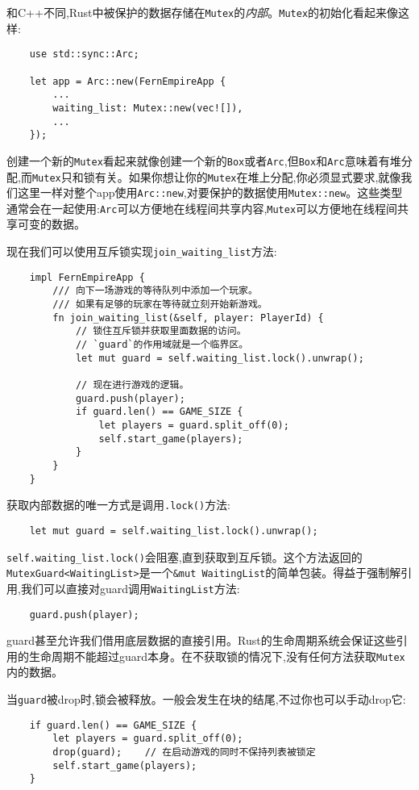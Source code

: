 和C++不同,Rust中被保护的数据存储在\texttt{Mutex}的\emph{内部}。\texttt{Mutex}的初始化看起来像这样:
\begin{verbatim}
    use std::sync::Arc;

    let app = Arc::new(FernEmpireApp {
        ...
        waiting_list: Mutex::new(vec![]),
        ...
    });
\end{verbatim}

创建一个新的\texttt{Mutex}看起来就像创建一个新的\texttt{Box}或者\texttt{Arc},但\texttt{Box}和\texttt{Arc}意味着有堆分配,而\texttt{Mutex}只和锁有关。如果你想让你的\texttt{Mutex}在堆上分配,你必须显式要求,就像我们这里一样对整个app使用\texttt{Arc::new},对要保护的数据使用\texttt{Mutex::new}。这些类型通常会在一起使用:\texttt{Arc}可以方便地在线程间共享内容,\texttt{Mutex}可以方便地在线程间共享可变的数据。

现在我们可以使用互斥锁实现\texttt{join\_waiting\_list}方法:
\begin{verbatim}
    impl FernEmpireApp {
        /// 向下一场游戏的等待队列中添加一个玩家。
        /// 如果有足够的玩家在等待就立刻开始新游戏。
        fn join_waiting_list(&self, player: PlayerId) {
            // 锁住互斥锁并获取里面数据的访问。
            // `guard`的作用域就是一个临界区。
            let mut guard = self.waiting_list.lock().unwrap();

            // 现在进行游戏的逻辑。
            guard.push(player);
            if guard.len() == GAME_SIZE {
                let players = guard.split_off(0);
                self.start_game(players);
            }
        }
    }
\end{verbatim}

获取内部数据的唯一方式是调用\texttt{.lock()}方法:
\begin{verbatim}
    let mut guard = self.waiting_list.lock().unwrap();
\end{verbatim}

\texttt{self.waiting\_list.lock()}会阻塞,直到获取到互斥锁。这个方法返回的\texttt{MutexGuard<WaitingList>}是一个\texttt{\&mut WaitingList}的简单包装。得益于强制解引用,我们可以直接对guard调用\texttt{WaitingList}方法:
\begin{verbatim}
    guard.push(player);
\end{verbatim}

guard甚至允许我们借用底层数据的直接引用。Rust的生命周期系统会保证这些引用的生命周期不能超过guard本身。在不获取锁的情况下,没有任何方法获取\texttt{Mutex}内的数据。

当\texttt{guard}被drop时,锁会被释放。一般会发生在块的结尾,不过你也可以手动drop它:
\begin{verbatim}
    if guard.len() == GAME_SIZE {
        let players = guard.split_off(0);
        drop(guard);    // 在启动游戏的同时不保持列表被锁定
        self.start_game(players);
    }
\end{verbatim}

